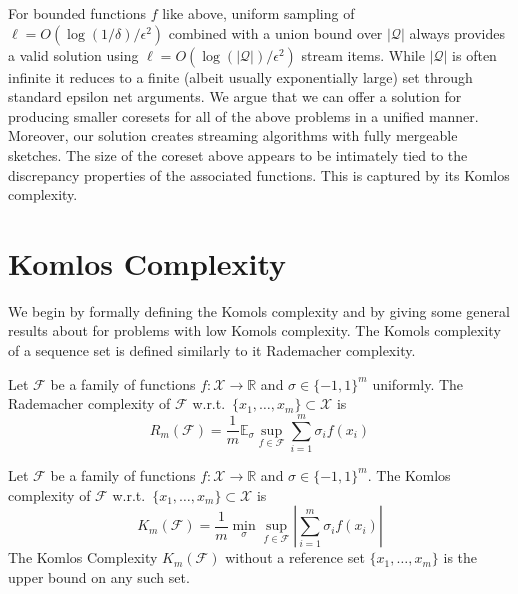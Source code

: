 \documentclass[anon,12pt]{colt2019} %
\newcommand{\R}{\mathbb{R}}
\newcommand{\E}{\mathbb{E}}
\newcommand{\eps}{\epsilon}
\newcommand{\F}{\mathcal{F}}
\newcommand{\X}{\mathcal{X}}
\begin{document}
For bounded functions $f$ like above, uniform sampling of $\ell = O(\log(1/\delta)/\eps^2)$ combined with a union bound over $|\mathcal Q|$ always provides a valid solution using $\ell = O(\log(|\mathcal Q|)/\eps^2)$ stream items. 
While $|\mathcal Q|$ is often infinite it reduces to a finite (albeit usually exponentially large) set through standard epsilon net arguments. 
We argue that we can offer a solution for producing smaller coresets for all of the above problems in a unified manner. 
Moreover, our solution creates streaming algorithms with fully mergeable sketches. 
The size of the coreset above appears to be intimately tied to the discrepancy properties of the associated functions.
This is captured by its Komlos complexity.  


\section{Komlos Complexity}
We begin by formally defining the Komols complexity and by giving some general results about for problems with low Komols complexity. The Komols complexity of a sequence set is defined similarly to it Rademacher complexity.
%

\begin{definition}
Let $\F$ be a family of functions $f:\X\rightarrow\R$ and $\sigma \in \{-1,1\}^m$ uniformly. 
The Rademacher complexity of $\F$ w.r.t.\ $\{x_1,\ldots,x_m\} \subset \X$ is 
\[
R_m(\F) =  \frac{1}{m}\E_{\sigma} \sup_{f \in \F}  \sum_{i=1}^{m}\sigma_i f(x_i)
\]
\end{definition}
%
\begin{definition}
Let $\F$ be a family of functions $f:\X\rightarrow\R$ and $\sigma \in \{-1,1\}^m$. 
The Komlos complexity of $\F$ w.r.t.\ $\{x_1,\ldots,x_m\} \subset \X$ is 
\[
K_m(\F) =  \frac{1}{m}\min_{\sigma} \sup_{f \in \F}  \left|\sum_{i=1}^{m}\sigma_i f(x_i)\right|
\]
The Komlos Complexity $K_m(\F)$ without a reference set $\{x_1,\ldots,x_m\}$ is the upper bound on any such set.
\end{definition}
\end{document}
